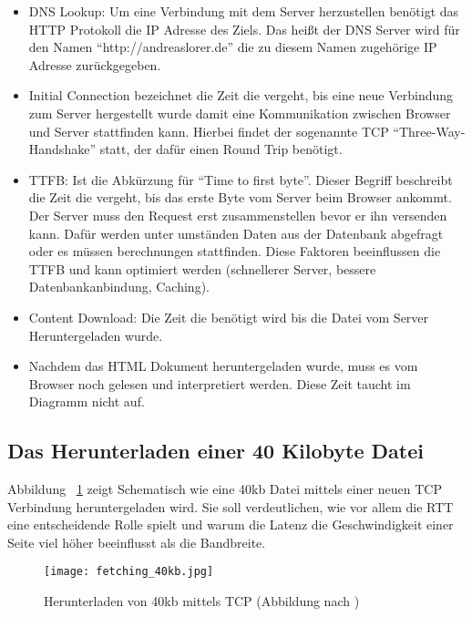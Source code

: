 			\begin{itemize}
				\item DNS Lookup: Um eine Verbindung mit dem Server herzustellen benötigt das HTTP Protokoll die IP Adresse des Ziels. Das heißt der DNS Server wird für den Namen "`http://andreaslorer.de"' die zu diesem Namen zugehörige IP Adresse zurückgegeben.

				\item Initial Connection bezeichnet die Zeit die vergeht, bis eine neue Verbindung zum Server hergestellt wurde damit eine Kommunikation zwischen Browser und Server stattfinden kann. Hierbei findet der sogenannte TCP "`Three-Way-Handshake"' statt, der dafür einen Round Trip benötigt.

				\item TTFB: Ist die Abkürzung für "`Time to first byte"'. Dieser Begriff beschreibt die Zeit die vergeht, bis das erste Byte vom Server beim Browser ankommt. Der Server muss den Request erst zusammenstellen bevor er ihn versenden kann. Dafür werden unter umständen Daten aus der Datenbank abgefragt oder es müssen berechnungen stattfinden. Diese Faktoren beeinflussen die TTFB und kann optimiert werden (schnellerer Server, bessere Datenbankanbindung, Caching).

				\item Content Download: Die Zeit die benötigt wird bis die Datei vom Server Heruntergeladen wurde.

				\item Nachdem das HTML Dokument heruntergeladen wurde, muss es vom Browser noch gelesen und interpretiert werden. Diese Zeit taucht im Diagramm nicht auf.
			\end{itemize}
					

	\subsection{Das Herunterladen einer 40 Kilobyte Datei} %
	\label{sub:das_herunterladen_einer_40_kb_datei}

		Abbildung ~\ref{fig:fetching_40kb} zeigt Schematisch wie eine 40kb Datei mittels einer neuen TCP Verbindung heruntergeladen wird. Sie soll verdeutlichen, wie vor allem die RTT eine entscheidende Rolle spielt und warum die Latenz die Geschwindigkeit einer Seite viel höher beeinflusst als die Bandbreite.

		\begin{figure}[htbp]
			\begin{center}
				\texttt{[image: fetching\_40kb.jpg]}
				\caption{Herunterladen von 40kb mittels TCP (Abbildung nach \autocite{grigorikTCP})}
				\label{fig:fetching_40kb}
			\end{center}
		\end{figure}

